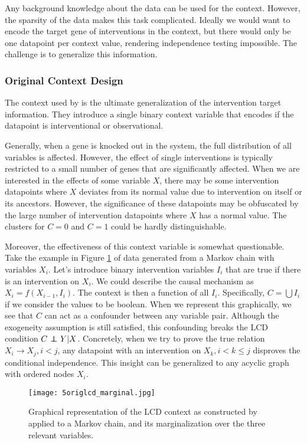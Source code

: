 Any background knowledge about the data can be used for the context. However, the sparsity of the data makes this task complicated. Ideally we would want to encode the target gene of interventions in the context, but there would only be one datapoint per context value, rendering independence testing impossible. The challenge is to generalize this information.

\subsubsection{Original Context Design}

The context used by \citet{versteeg2019boosting} is the ultimate generalization of the intervention target information. They introduce a single binary context variable that encodes if the datapoint is interventional or observational. 

Generally, when a gene is knocked out in the system, the full distribution of all variables is affected. However, the effect of single interventions is typically restricted to a small number of genes that are significantly affected. When we are interested in the effects of some variable $X$, there may be some intervention datapoints where $X$ deviates from its normal value due to intervention on itself or its ancestors. However, the significance of these datapoints may be obfuscated by the large number of intervention datapoints where $X$ has a normal value. The clusters for $C=0$ and $C=1$ could be hardly distinguishable. 

Moreover, the effectiveness of this context variable is somewhat questionable. Take the example in Figure \ref{fig:5:origlcd} of data generated from a Markov chain with variables $X_i$. Let's introduce binary intervention variables $I_i$ that are true if there is an intervention on $X_i$. We could describe the causal mechanism as $X_i = f(X_{i-1}, I_i)$. The context is then a function of all $I_i$. Specifically, $C=\bigcup I_i$ if we consider the values to be boolean. When we represent this graphically, we see that $C$ can act as a confounder between any variable pair. Although the exogeneity assumption is still satisfied, this confounding breaks the LCD condition $C\operatorname*{{\,\perp\mkern-12mu\perp\,}} Y|X$. Concretely, when we try to prove the true relation $X_i\to X_j, i<j$, any datapoint with an intervention on $X_k, i<k\leq j$ disproves the conditional independence. This insight can be generalized to any acyclic graph with ordered nodes $X_i$. 

\begin{figure}[h]
    \centering
    \texttt{[image: 5origlcd\_marginal.jpg]}
    \caption{Graphical representation of the LCD context as constructed by \citet{versteeg2019boosting} applied to a Markov chain, and its marginalization over the three relevant variables.}
    \label{fig:5:origlcd}
\end{figure}


